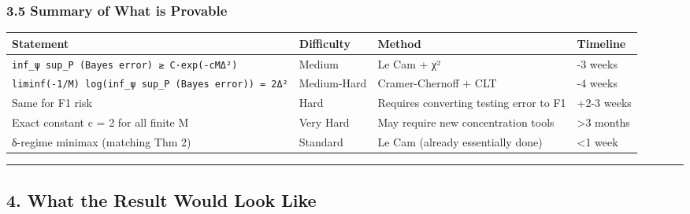 \documentclass[
  12pt,
]{article}
\begin{document}
\subsubsection{3.5 Summary of What is
Provable}\label{summary-of-what-is-provable}

\begin{longtable}[]{@{}
  >{\raggedright\arraybackslash}p{}
  >{\raggedright\arraybackslash}p{}
  >{\raggedright\arraybackslash}p{}
  >{\raggedright\arraybackslash}p{}@{}}
\toprule\noalign{}
\begin{minipage}[b]{\linewidth}\raggedright
Statement
\end{minipage} & \begin{minipage}[b]{\linewidth}\raggedright
Difficulty
\end{minipage} & \begin{minipage}[b]{\linewidth}\raggedright
Method
\end{minipage} & \begin{minipage}[b]{\linewidth}\raggedright
Timeline
\end{minipage} \\
\midrule\noalign{}
\endhead
\bottomrule\noalign{}
\endlastfoot
\texttt{inf\_ψ\ sup\_P\ (Bayes\ error)\ ≥\ C·exp(-cMΔ²)} & Medium & Le
Cam + χ² & 2-3 weeks \\
\texttt{liminf(-1/M)\ log(inf\_ψ\ sup\_P\ (Bayes\ error))\ =\ 2Δ²} &
Medium-Hard & Cramer-Chernoff + CLT & 3-4 weeks \\
Same for F1 risk & Hard & Requires converting testing error to F1 & +2-3
weeks \\
Exact constant c = 2 for all finite M & Very Hard & May require new
concentration tools & \textgreater3 months \\
δ-regime minimax (matching Thm 2) & Standard & Le Cam (already
essentially done) & \textless1 week \\
\end{longtable}

\begin{center}\rule{0.5\linewidth}{0.5pt}\end{center}

\subsection{4. What the Result Would Look
Like}\label{what-the-result-would-look-like}
\end{document}
